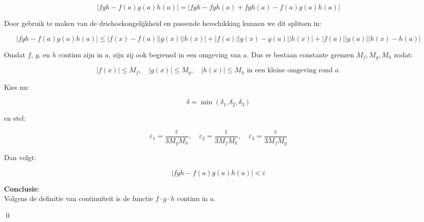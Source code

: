 \documentclass[a4paper]{article}
\begin{document}
\[
|fgh - f(a)g(a)h(a)| = |fgh - fgh(a) + fgh(a) - f(a)g(a)h(a)|
\]

Door gebruik te maken van de driehoekongelijkheid en passende herschikking kunnen we dit splitsen in:

\[
|fgh - f(a)g(a)h(a)| \leq |f(x) - f(a)||g(x)||h(x)| + |f(a)||g(x) - g(a)||h(x)| + |f(a)||g(a)||h(x) - h(a)|
\]

Omdat $f$, $g$, en $h$ continu zijn in $a$, zijn zij ook begrensd in een omgeving van $a$. Dus er bestaan constante grenzen \( M_f, M_g, M_h \) zodat:

\[
|f(x)| \leq M_f, \quad |g(x)| \leq M_g, \quad |h(x)| \leq M_h \text{ in een kleine omgeving rond } a.
\]

Kies nu:

\[
\delta = \min(\delta_1, \delta_2, \delta_3)
\]

en stel:

\[
\varepsilon_1 = \frac{\varepsilon}{3 M_g M_h}, \quad \varepsilon_2 = \frac{\varepsilon}{3 M_f M_h}, \quad \varepsilon_3 = \frac{\varepsilon}{3 M_f M_g}
\]

Dan volgt:

\[
|fgh - f(a)g(a)h(a)| < \varepsilon
\]

\textbf{Conclusie}: \\

Volgens de definitie van continuïteit is de functie $f \cdot g \cdot h$ continu in $a$.

\qed

\begin{thebibliography}{99}

\end{thebibliography}
\end{document}
